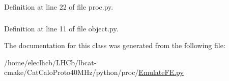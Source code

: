 Definition at line 22 of file proc.py.\hypertarget{classobject_1_1object_a6b4e1fd053496eafff2bc0f8aed7f089}{
\subsubsection[{path}]{}}
\label{classobject_1_1object_a6b4e1fd053496eafff2bc0f8aed7f089}


Definition at line 11 of file object.py.

The documentation for this class was generated from the following file:\begin{DoxyCompactItemize}
\item 
/home/eleclhcb/LHCb/lbcat-\/cmake/CatCaloProto40MHz/python/proc/\hyperlink{EmulateFE_8py}{EmulateFE.py}\end{DoxyCompactItemize}

